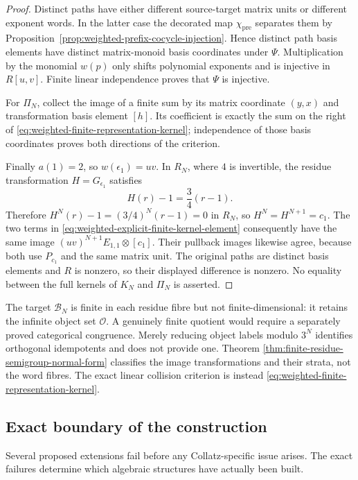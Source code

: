 \begin{proof}
Distinct paths have either different source-target matrix units or different
exponent words.  In the latter case the decorated map
$\chi_{\mathrm{pre}}$ separates them by
Proposition~\ref{prop:weighted-prefix-cocycle-injection}.  Hence distinct path
basis elements have distinct matrix-monoid basis coordinates under $\Psi$.
Multiplication by the monomial $w(p)$ only shifts polynomial exponents and is
injective in $R[u,v]$.  Finite linear independence proves that $\Psi$ is
injective.

For $\Pi_N$, collect the image of a finite sum by its matrix coordinate
$(y,x)$ and transformation basis element $[h]$.  Its coefficient is exactly
the sum on the right of
\eqref{eq:weighted-finite-representation-kernel}; independence of those basis
coordinates proves both directions of the criterion.

Finally $a(1)=2$, so $w(\epsilon_1)=uv$.  In $R_N$, where $4$ is invertible,
the residue transformation $H=G_{\epsilon_1}$ satisfies
\[
 H(r)-1=\frac34(r-1).
\]
Therefore $H^N(r)-1=(3/4)^N(r-1)=0$ in $R_N$, so
$H^N=H^{N+1}=c_1$.  The two terms in
\eqref{eq:weighted-explicit-finite-kernel-element} consequently have the same
image $(uv)^{N+1}E_{1,1}\otimes[c_1]$.  Their pullback images likewise agree,
because both use $P_{c_1}$ and the same matrix unit.  The original paths are
distinct basis elements and $R$ is nonzero, so their displayed difference is
nonzero.  No equality between the full kernels of $K_N$ and $\Pi_N$ is
asserted.
\end{proof}

The target $\mathcal B_N$ is finite in each residue fibre but not
finite-dimensional: it retains the infinite object set $\mathcal O$.  A
genuinely finite quotient would require a separately proved categorical
congruence.  Merely reducing object labels modulo $3^N$ identifies orthogonal
 idempotents and does not provide one.  Theorem
\ref{thm:finite-residue-semigroup-normal-form} classifies the image
transformations and their strata, not the word fibres.  The exact linear
collision criterion is instead
\eqref{eq:weighted-finite-representation-kernel}.

\subsection{Exact boundary of the construction}

Several proposed extensions fail before any Collatz-specific issue arises.
The exact failures determine which algebraic structures have actually been
built.

